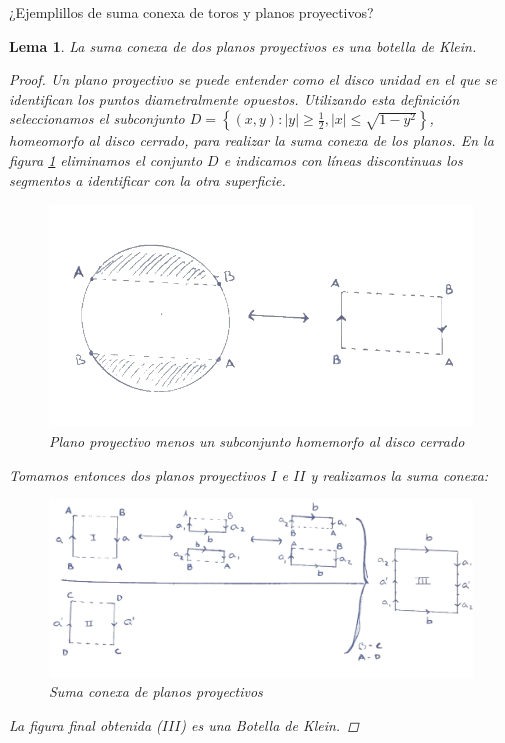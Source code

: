 \documentclass[a4paper,11pt,spanish, twoside, leqno]{tfg-uam}
\newtheorem{lema}[teor]{Lema}
\theoremstyle{definition}
\begin{document}
¿Ejemplillos de suma conexa de toros y planos proyectivos?

\begin{lema}\label{lema:sumadedosplanosproyectivos}
	La suma conexa de dos planos proyectivos es una botella de Klein.
	\begin{proof}
		Un plano proyectivo se puede entender como el disco unidad en el que se identifican los puntos diametralmente opuestos. Utilizando esta definición seleccionamos el subconjunto $D = \left\{(x,y): |y|\geq\frac{1}{2}, |x|\leq\sqrt{1-y^2} \right\}$, homeomorfo al disco cerrado, para realizar la suma conexa de los planos. En la figura  \ref{fig:parte1SumaConexaDePlanosP} eliminamos el conjunto $D$ e indicamos con líneas discontinuas los segmentos a identificar con la otra superficie.
		
		\begin{figure}[h]\label{fig:parte1SumaConexaDePlanosP}
			\centering
			\includegraphics[width=0.7\linewidth]{imagenes/p1planop.png}
			\caption{Plano proyectivo menos un subconjunto homemorfo al disco cerrado}
		\end{figure} 
	
		Tomamos entonces dos planos proyectivos $I$ e $II$ y realizamos la suma conexa:
		
		\begin{figure}[h]\label{fig:sumaconexadepps}
			\centering
			\includegraphics[width=0.8\linewidth]{imagenes/sumapps.png}
			\caption{Suma conexa de planos proyectivos}
		\end{figure} 
		La figura final obtenida ($III$) es una \textit{Botella de Klein}.
	\end{proof}
\end{lema}
\end{document}
